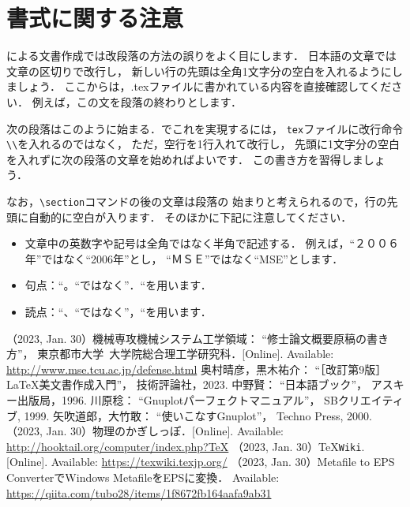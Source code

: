 \documentclass[twocolumn]{jsarticle}
\begin{document}
\section{書式に関する注意}
\LaTeXe による文書作成では改段落の方法の誤りをよく目にします．
日本語の文章では文章の区切りで改行し，
新しい行の先頭は全角1文字分の空白を入れるようにしましょう．
ここからは，.texファイルに書かれている内容を直接確認してください．
例えば，この文を段落の終わりとします．

次の段落はこのように始まる．\LaTeXe でこれを実現するには，
\texttt{tex}ファイルに改行命令\verb+\\+を入れるのではなく，
ただ，空行を1行入れて改行し，
先頭に1文字分の空白を入れずに次の段落の文章を始めればよいです．
この書き方を習得しましょう．

なお，\verb+\section+コマンドの後の文章は段落の
始まりと考えられるので，行の先頭に自動的に空白が入ります．
そのほかに下記に注意してください．
\begin{itemize}
\item 文章中の英数字や記号は全角ではなく半角で記述する．
  例えば，``２００６年''ではなく``2006年''とし，
  ``ＭＳＥ''ではなく``MSE''とします．
\item 句点：``。``ではなく''．``を用います．
\item 読点：``、``ではなく''，``を用います．
\end{itemize}

{\small
\begin{thebibliography}{99}
  （2023, Jan. 30）機械専攻機械システム工学領域：
  ``修士論文概要原稿の書き方''，
  東京都市大学~大学院総合理工学研究科．[Online].
  Available: \url{http://www.mse.tcu.ac.jp/defense.html}
  奥村晴彦，黒木祐介：
  ``［改訂第9版］\LaTeX 美文書作成入門''，
  技術評論社，2023.
  中野賢：
  ``日本語\LaTeXe ブック''，
  アスキー出版局，1996.
  川原稔：
  ``Gnuplotパーフェクトマニュアル''，
  SBクリエイティブ, 1999.
  矢吹道郎，大竹敢：
  ``使いこなすGnuplot''，
  Techno Press, 2000.
  （2023, Jan. 30）物理のかぎしっぽ．[Online].
  Available: \url{http://hooktail.org/computer/index.php?TeX}
  （2023, Jan. 30）\TeX \texttt{Wiki}. [Online].
  Available: \url{https://texwiki.texjp.org/}
  （2023, Jan. 30）Metafile to EPS ConverterでWindows MetafileをEPSに変換．
  Available: \url{https://qiita.com/tubo28/items/1f8672fb164aafa9ab31}
\end{thebibliography}
}
\end{document}
